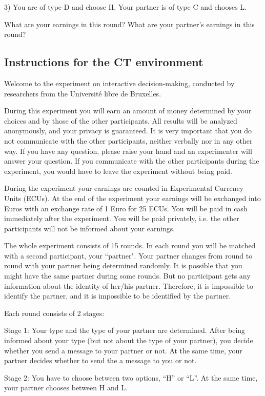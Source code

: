 \documentclass[12pt]{article}
\theoremstyle{break}
\begin{document}
3) You are of type D and choose H. Your partner is of type C and chooses L.

What are your earnings in this round?
What are your partner’s earnings in this round?


\subsection{Instructions for the CT environment}

Welcome to the experiment on interactive decision-making, conducted by researchers from the Université libre de Bruxelles.

During this experiment you will earn an amount of money determined by your choices and by those of the other participants. All results will be analyzed anonymously, and your privacy is guaranteed. It is very important that you do not communicate with the other participants, neither verbally nor in any other way. If you have any question, please raise your hand and an experimenter will answer your question. If you communicate with the other participants during the experiment, you would have to leave the experiment without being paid. 

During the experiment your earnings are counted in Experimental Currency Units (ECUs). At the end of the experiment your earnings will be exchanged into Euros with an exchange rate of 1 Euro for 25 ECUs. You will be paid in cash immediately after the experiment. You will be paid privately, i.e. the other participants will not be informed about your earnings.

The whole experiment consists of 15 rounds. In each round you will be matched with a second participant, your ``partner". Your partner changes from round to round with your partner being determined randomly. It is possible that you might have the same partner during some rounds. But no participant gets any information about the identity of her/his partner. Therefore, it is impossible to identify the partner, and it is impossible to be identified by the partner.

Each round consists of 2 stages:

Stage 1: Your type and the type of your partner are determined. After being informed about your type (but not about the type of your partner), you decide whether you send a message to your partner or not. At the same time, your partner decides whether to send the a message to you or not.

Stage 2: You have to choose between two options, “H” or “L”. At the same time, your partner chooses between H and L. 
\end{document}
